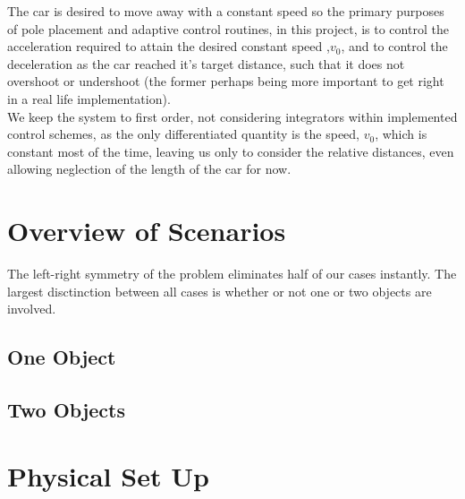 \documentclass[a4paper,onecolumn,amsmath,amssymb]{revtex4-1}
\begin{document}
 
The car is desired to move away with a constant speed so the primary purposes of pole placement and adaptive control routines, in this project, is to control the acceleration required to attain the desired constant speed ,$v_0$, and to control the deceleration as the car reached it's target distance, such that it does not overshoot or undershoot (the former perhaps being more important to get right in a real life implementation).\\


We keep the system to first order, not considering integrators within implemented control schemes, as the only differentiated quantity is the speed, $v_0$, which is constant most of the time,  leaving us only to consider the relative distances, even allowing neglection of the length of the car for now. 

\section{\textbf{Overview of Scenarios}}

The left-right symmetry of the problem eliminates half of our cases instantly. The largest disctinction between all cases is whether or not one or two objects are involved.\\
\subsection{\textbf{One  Object}}

\subsection{\textbf{Two Objects}}

\section{\textbf{Physical Set Up}}
\end{document}

